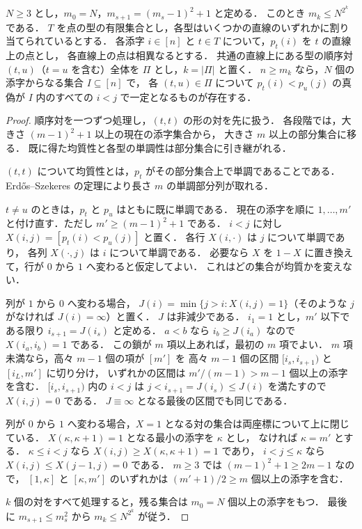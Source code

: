 \begin{lemma}[順序の多項式的均質化]
\label{lem:order-homogenize}
$N\ge3$ とし，$m_0=N$，$m_{s+1}=(m_s-1)^2+1$ と定める．
このとき $m_k\le N^{2^k}$ である．
$T$ を点の型の有限集合とし，各型はいくつかの直線のいずれかに割り当てられているとする．
各添字 $i\in[n]$ と $t\in T$ について，$p_t(i)$ を $t$ の直線上の点とし，
各直線上の点は相異なるとする．
共通の直線上にある型の順序対 $(t,u)$（$t=u$ を含む）全体を $\Pi$ とし，$k=|\Pi|$ と置く．
$n\ge m_k$ なら，$N$ 個の添字からなる集合 $I\subseteq[n]$ で，
各 $(t,u)\in\Pi$ について $p_t(i)<p_u(j)$ の真偽が
$I$ 内のすべての $i<j$ で一定となるものが存在する．
\end{lemma}
\begin{proof}
順序対を一つずつ処理し，$(t,t)$ の形の対を先に扱う．
各段階では，大きさ $(m-1)^2+1$ 以上の現在の添字集合から，
大きさ $m$ 以上の部分集合に移る．
既に得た均質性と各型の単調性は部分集合に引き継がれる．

$(t,t)$ について均質性とは，$p_t$ がその部分集合上で単調であることである．
Erd\H{o}s--Szekeres の定理により長さ $m$ の単調部分列が取れる．

$t\ne u$ のときは，$p_t$ と $p_u$ はともに既に単調である．
現在の添字を順に $1,\ldots,m'$ と付け直す．ただし $m'\ge(m-1)^2+1$ である．
$i<j$ に対し $X(i,j)=[p_t(i)<p_u(j)]$ と置く．
各行 $X(i,\cdot)$ は $j$ について単調であり，
各列 $X(\cdot,j)$ は $i$ について単調である．
必要なら $X$ を $1-X$ に置き換えて，行が $0$ から $1$ へ変わると仮定してよい．
これはどの集合が均質かを変えない．

列が $1$ から $0$ へ変わる場合，
$J(i)=\min\{j>i:X(i,j)=1\}$（そのような $j$ がなければ $J(i)=\infty$）と置く．
$J$ は非減少である．
$i_1=1$ とし，$m'$ 以下である限り $i_{s+1}=J(i_s)$ と定める．
$a<b$ なら $i_b\ge J(i_a)$ なので $X(i_a,i_b)=1$ である．
この鎖が $m$ 項以上あれば，最初の $m$ 項でよい．
$m$ 項未満なら，高々 $m-1$ 個の項が $[m']$ を
高々 $m-1$ 個の区間 $[i_s,i_{s+1})$ と $[i_L,m']$ に切り分け，
いずれかの区間は $m'/(m-1)>m-1$ 個以上の添字を含む．
$[i_s,i_{s+1})$ 内の $i<j$ は $j<i_{s+1}=J(i_s)\le J(i)$ を満たすので $X(i,j)=0$ である．
$J\equiv\infty$ となる最後の区間でも同じである．

列が $0$ から $1$ へ変わる場合，$X=1$ となる対の集合は両座標について上に閉じている．
$X(\kappa,\kappa+1)=1$ となる最小の添字を $\kappa$ とし，
なければ $\kappa=m'$ とする．
$\kappa\le i<j$ なら $X(i,j)\ge X(\kappa,\kappa+1)=1$ であり，
$i<j\le\kappa$ なら $X(i,j)\le X(j-1,j)=0$ である．
$m\ge3$ では $(m-1)^2+1\ge2m-1$ なので，
$[1,\kappa]$ と $[\kappa,m']$ のいずれかは $(m'+1)/2\ge m$ 個以上の添字を含む．

$k$ 個の対をすべて処理すると，残る集合は $m_0=N$ 個以上の添字をもつ．
最後に $m_{s+1}\le m_s^2$ から $m_k\le N^{2^k}$ が従う．
\end{proof}


